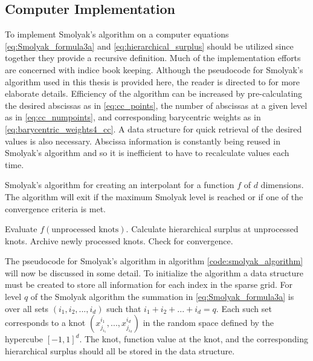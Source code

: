 \subsection{Computer Implementation} \label{subsec:smolyak_implementation}

To implement Smolyak's algorithm on a computer equations \ref{eq:Smolyak_formula3a} and \ref{eq:hierarchical_surplus} should be utilized since together they provide a recursive definition. Much of the implementation efforts are concerned with indice book keeping. Although the pseudocode for Smolyak's algorithm used in this thesis is provided here, the reader is directed to \cite{Klimke_Wohlmuth} for more elaborate details. Efficiency of the algorithm can be increased by pre-calculating the desired abscissas as in \ref{eq:cc_points}, the number of abscissas at a given level as in \ref{eq:cc_numpoints}, and corresponding barycentric weights as in \ref{eq:barycentric_weights4_cc}. A data structure for quick retrieval of the desired values is also necessary. Abscissa information is constantly being reused in Smolyak's algorithm and so it is inefficient to have to recalculate values each time.   
\begin{algorithm}
\caption{\label{code:smolyak_algorithm} Smolyak's algorithm for creating an interpolant for a function $f$ of $d$ dimensions. The algorithm will exit if the maximum Smolyak level is reached or if one of the convergence criteria is met.}  
\begin{algorithmic}[1]
      \EndFor
      \State Evaluate $f(\text{unprocessed knots})$.
      \State Calculate hierarchical surplus at unprocessed knots. 
      \State Archive newly processed knots.
   \EndFor
   \State Check for convergence.
\EndFor 
\end{algorithmic}
\end{algorithm}

The pseudocode for Smolyak's algorithm in algorithm \ref{code:smolyak_algorithm} will now be discussed in some detail. To initialize the algorithm a data structure must be created to store all information for each index in the sparse grid. For level $q$ of the Smolyak algorithm the summation in \ref{eq:Smolyak_formula3a} is over all sets $(i_1,i_2,...,i_d)$ such that $i_1 + i_2 + ... + i_d = q$. Each such set corresponds to a knot $(x^{i_1}_{j_{i_1}}, ..., x^{i_d}_{j_{i_d}})$ in the random space defined by the hypercube $\left[-1,1\right]^d$. The knot, function value at the knot, and the corresponding hierarchical surplus should all be stored in the data structure. 

